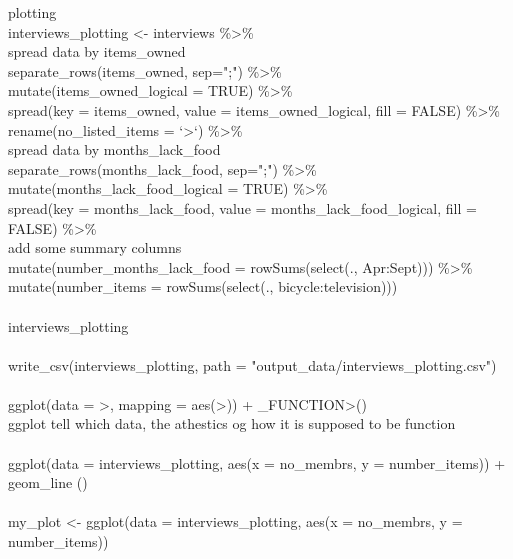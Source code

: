\documentclass{article}
\begin{document}
  plotting\\
interviews\_plotting \textless- interviews \%\textgreater\%\\
     spread data by items\_owned\\
  separate\_rows(items\_owned, sep=";") \%\textgreater\%\\
  mutate(items\_owned\_logical = TRUE) \%\textgreater\%\\
  spread(key = items\_owned, value = items\_owned\_logical, fill = FALSE) \%\textgreater\%\\
  rename(no\_listed\_items = `\textlessNA\textgreater`) \%\textgreater\%\\
     spread data by months\_lack\_food\\
  separate\_rows(months\_lack\_food, sep=";") \%\textgreater\%\\
  mutate(months\_lack\_food\_logical = TRUE) \%\textgreater\%\\
  spread(key = months\_lack\_food, value = months\_lack\_food\_logical, fill = FALSE) \%\textgreater\%\\
     add some summary columns\\
  mutate(number\_months\_lack\_food = rowSums(select(., Apr:Sept))) \%\textgreater\%\\
  mutate(number\_items = rowSums(select(., bicycle:television)))\\\\

interviews\_plotting\\\\

write\_csv(interviews\_plotting, path = "output\_data/interviews\_plotting.csv")\\\\

  ggplot(data = \textlessDATA\textgreater, mapping = aes(\textlessMAPPINGS\textgreater)) +  \textlessGEOM\_FUNCTION\textgreater() \\
  ggplot tell which data, the athestics og how it is supposed to be function\\\\

ggplot(data = interviews\_plotting, aes(x = no\_membrs, y = number\_items)) + geom\_line ()\\\\

my\_plot \textless- ggplot(data = interviews\_plotting, aes(x = no\_membrs, y = number\_items))\\\\
\end{document}
